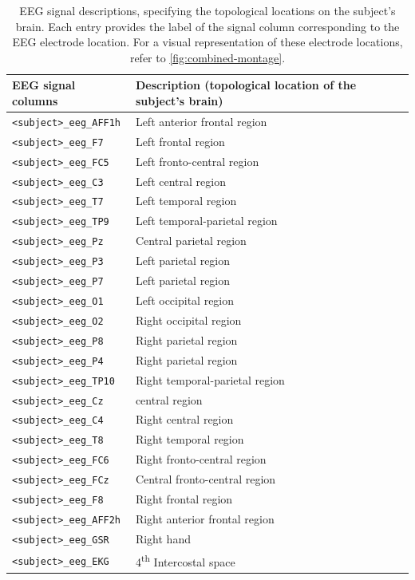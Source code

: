 \begin{table}
\centering
\begin{tabularx}{\textwidth}{lX}
    \toprule
    EEG signal columns & Description (topological location of the subject's brain) \\
    \midrule
    \texttt{<subject>\_eeg\_AFF1h} & Left anterior frontal region \\
    \texttt{<subject>\_eeg\_F7} & Left frontal region  \\
    \texttt{<subject>\_eeg\_FC5} & Left fronto-central region  \\
    \texttt{<subject>\_eeg\_C3} & Left central region \\
    \texttt{<subject>\_eeg\_T7} & Left temporal region \\
    \texttt{<subject>\_eeg\_TP9} & Left temporal-parietal region \\
    \texttt{<subject>\_eeg\_Pz} & Central parietal region \\
    \texttt{<subject>\_eeg\_P3} & Left parietal region \\
    \texttt{<subject>\_eeg\_P7} & Left parietal region \\
    \texttt{<subject>\_eeg\_O1} & Left occipital region \\
    \texttt{<subject>\_eeg\_O2} & Right occipital region \\
    \texttt{<subject>\_eeg\_P8} & Right parietal region \\
    \texttt{<subject>\_eeg\_P4} & Right parietal region \\
    \texttt{<subject>\_eeg\_TP10} & Right temporal-parietal region \\
    \texttt{<subject>\_eeg\_Cz} & central region \\
    \texttt{<subject>\_eeg\_C4} & Right central region \\
    \texttt{<subject>\_eeg\_T8} & Right temporal region \\
    \texttt{<subject>\_eeg\_FC6} & Right fronto-central region \\
    \texttt{<subject>\_eeg\_FCz} & Central fronto-central region \\
    \texttt{<subject>\_eeg\_F8} & Right frontal region \\
    \texttt{<subject>\_eeg\_AFF2h} & Right anterior frontal region \\
    \texttt{<subject>\_eeg\_GSR} & Right hand \\
    \texttt{<subject>\_eeg\_EKG} & 4\textsuperscript{th} Intercostal space \\
    \bottomrule
\end{tabularx}
\caption{EEG signal descriptions, specifying the topological locations on the subject's brain. Each entry provides the label of the signal column corresponding to the EEG electrode location. For a visual representation of these electrode locations, refer to \autoref{fig:combined-montage}.
}
\label{tab:EEG_signals}
\end{table}


